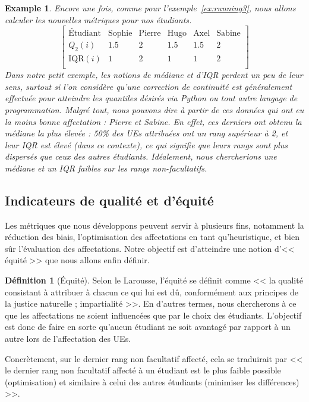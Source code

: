 \documentclass{rapport}
\theoremstyle{definition}
\newtheorem{definition}{Définition}
\theoremstyle{remark}
\theoremstyle{plain}
\newtheorem{example}{Example}
\theoremstyle{definition}
\theoremstyle{definition}
\theoremstyle{remark}
\theoremstyle{definition}
\begin{document}
\begin{example}\label{ex:running4}
    Encore une fois, comme pour l'exemple~\ref{ex:running3}, nous allons calculer les nouvelles métriques pour nos étudiants.
    $$
    \begin{bmatrix}
        \text{Étudiant} & \text{Sophie} & \text{Pierre} & \text{Hugo} & \text{Axel} & \text{Sabine}\\
        Q_2(i)          & 1.5 & 2 & 1.5 & 1.5 & 2\\
        \text{IQR}(i)   & 1   & 2 & 1   & 1   & 2\\
    \end{bmatrix}
    $$
    Dans notre petit exemple, les notions de médiane et d'IQR perdent un peu de leur sens, surtout si l'on considère qu'une correction de continuité est généralement effectuée pour atteindre les quantiles désirés via Python ou tout autre langage de programmation.
    Malgré tout, nous pouvons dire à partir de ces données qui ont eu la moins bonne affectation : Pierre et Sabine.
    En effet, ces derniers ont obtenu la médiane la plus élevée : 50\% des UEs attribuées ont un rang supérieur à 2, et leur IQR est élevé (dans ce contexte), ce qui signifie que leurs rangs sont plus dispersés que ceux des autres étudiants.
    Idéalement, nous chercherions une médiane et un IQR faibles sur les rangs non-facultatifs.
\end{example}

\subsection{Indicateurs de qualité et d'équité}
Les métriques que nous développons peuvent servir à plusieurs fins, notamment la réduction des biais, l'optimisation des affectations en tant qu'heuristique, et bien sûr l'évaluation des affectations.
Notre objectif est d'atteindre une notion d'<< équité >> que nous allons enfin définir.

\begin{definition}[Équité]
    Selon le Larousse, l'équité se définit comme << la qualité consistant à attribuer à chacun ce qui lui est dû, conformément aux principes de la justice naturelle ; impartialité >>.
    En d'autres termes, nous chercherons à ce que les affectations ne soient influencées que par le choix des étudiants. L'objectif est donc de faire en sorte qu'aucun étudiant ne soit avantagé par rapport à un autre lors de l'affectation des UEs.

    Concrètement, sur le dernier rang non facultatif affecté, cela se traduirait par << le dernier rang non facultatif affecté à un étudiant est le plus faible possible (optimisation) et similaire à celui des autres étudiants (minimiser les différences) >>.
\end{definition}
\end{document}
